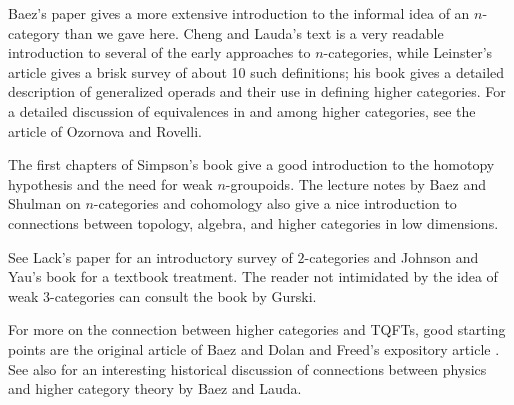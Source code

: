\documentclass[a4paper,12pt]{article}
\begin{document}
Baez's paper \cite{BaezNcat} gives a more extensive introduction to
the informal idea of an $n$-category than we gave here. Cheng and
Lauda's text \cite{ChengLauda} is a very readable introduction to
several of the early approaches to $n$-categories, while Leinster's
article \cite{LeinsterSurvey} gives a brisk survey of about 10 such
definitions; his book \cite{LeinsterBook} gives a detailed
description of generalized operads and their use in defining higher categories. For a detailed discussion of equivalences in and among
higher categories, see the article \cite{ORequiv} of Ozornova and
Rovelli.

The first chapters of Simpson's book \cite{Simpson} give a good
introduction to the homotopy hypothesis and the need for weak
$n$-groupoids. The lecture notes \cite{BaezShulman} by Baez and
Shulman on $n$-categories and cohomology also give a nice introduction
to connections between topology, algebra, and higher categories in low
dimensions.

See Lack's paper \cite{Lack} for an introductory survey of
$2$-categories and Johnson and Yau's book \cite{JohnsonYau} for a
textbook treatment. The reader not intimidated by the idea of weak
$3$-categories can consult the book \cite{Gurski} by Gurski.

For more on the connection between higher categories and TQFTs, good
starting points are the original article \cite{BaezDolanTQFT} of Baez
and Dolan and Freed's expository article \cite{FreedCob}. See also
\cite{BaezLauda} for an interesting historical discussion of
connections between physics and higher category theory by Baez and
Lauda.
\end{document}
